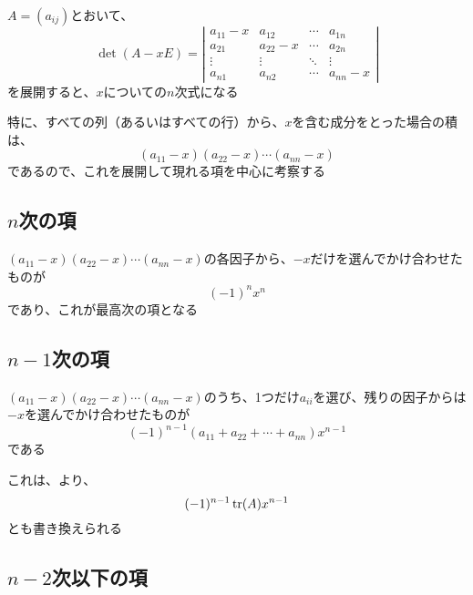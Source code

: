 \documentclass[../../../topic_linear-algebra]{subfiles}
\begin{document}
\sectionline

$A = (a_{ij})$とおいて、
\begin{equation*}
  \det(A - xE ) = \left|\begin{matrix}
    a_{11} - x & a_{12}     & \cdots & a_{1n}     \\
    a_{21}     & a_{22} - x & \cdots & a_{2n}     \\
    \vdots     & \vdots     & \ddots & \vdots     \\
    a_{n1}     & a_{n2}     & \cdots & a_{nn} - x
  \end{matrix}\right|
\end{equation*}
を展開すると、$x$についての$n$次式になる

特に、すべての列（あるいはすべての行）から、$x$を含む成分をとった場合の積は、
\begin{equation*}
  (a_{11} - x)(a_{22} - x) \cdots (a_{nn} - x)
\end{equation*}
であるので、これを展開して現れる項を中心に考察する

\subsection{$n$次の項}

$(a_{11} - x)(a_{22} - x) \cdots (a_{nn} - x)$の各因子から、$-x$だけを選んでかけ合わせたものが
\begin{equation*}
  (-1)^n x^n
\end{equation*}
であり、これが最高次の項となる

\subsection{$n-1$次の項}

$(a_{11} - x)(a_{22} - x) \cdots (a_{nn} - x)$のうち、1つだけ$a_{ii}$を選び、残りの因子からは$-x$を選んでかけ合わせたものが
\begin{equation*}
  (-1)^{n-1} (a_{11} + a_{22} + \cdots + a_{nn}) x^{n-1}
\end{equation*}
である

これは、より、
\begin{equation*}
  (-1)^{n-1} \tr(A) x^{n-1}
\end{equation*}
とも書き換えられる

\subsection{$n-2$次以下の項}
\end{document}
